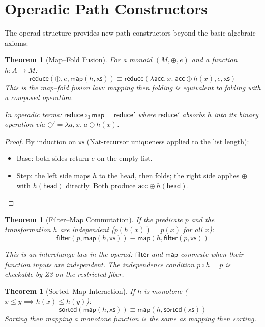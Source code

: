 \documentclass[11pt,a4paper]{report}
\theoremstyle{definition}
\theoremstyle{plain}
\newtheorem{theorem}[definition]{Theorem}
\begin{document}
\section{Operadic Path Constructors}

The operad structure provides new path constructors beyond the
basic algebraic axioms:

\begin{theorem}[Map--Fold Fusion]
\label{thm:map-fold}
For a monoid $(M, \oplus, e)$ and a function $h : A \to M$:
\[
  \mathsf{reduce}(\oplus, e, \mathsf{map}(h, \mathsf{xs}))
  \equiv
  \mathsf{reduce}(\lambda \mathsf{acc}, x.\; \mathsf{acc} \oplus h(x),
    e, \mathsf{xs})
\]
This is the \emph{map--fold fusion law}: mapping then folding is
equivalent to folding with a composed operation.

In operadic terms: $\mathsf{reduce} \circ_3 \mathsf{map}
= \mathsf{reduce}'$ where $\mathsf{reduce}'$ absorbs $h$ into
its binary operation via $\oplus' = \lambda a, x.\; a \oplus h(x)$.
\end{theorem}

\begin{proof}
By induction on $\mathsf{xs}$ (Nat-recursor uniqueness applied to
the list length):
\begin{itemize}
  \item Base: both sides return $e$ on the empty list.
  \item Step: the left side maps $h$ to the head, then folds; the
    right side applies $\oplus$ with $h(\mathsf{head})$ directly.
    Both produce $\mathsf{acc} \oplus h(\mathsf{head})$.
\end{itemize}
\end{proof}

\begin{theorem}[Filter--Map Commutation]
\label{thm:filter-map}
If the predicate $p$ and the transformation $h$ are independent
($p(h(x)) = p(x)$ for all $x$):
\[
  \mathsf{filter}(p, \mathsf{map}(h, \mathsf{xs}))
  \equiv
  \mathsf{map}(h, \mathsf{filter}(p, \mathsf{xs}))
\]

This is an \emph{interchange law} in the operad: $\mathsf{filter}$ and
$\mathsf{map}$ commute when their function inputs are independent.
The independence condition $p \circ h = p$ is checkable by Z3 on the
restricted fiber.
\end{theorem}

\begin{theorem}[Sorted--Map Interaction]
\label{thm:sorted-map}
If $h$ is \emph{monotone} ($x \leq y \implies h(x) \leq h(y)$):
\[
  \mathsf{sorted}(\mathsf{map}(h, \mathsf{xs}))
  \equiv
  \mathsf{map}(h, \mathsf{sorted}(\mathsf{xs}))
\]
Sorting then mapping a monotone function is the same as mapping
then sorting.
\end{theorem}
\end{document}
